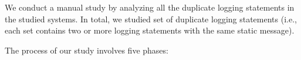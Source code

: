 \begin{comment}
This process involves 3 phases and is performed by the first
two authors (i.e., A1–A2) in this paper:
• Phase I: A1 derived a draft list of types of performed
actions based on 50 random answers. Then, A1 and
A2 use the draft list to categorize the answers collaboratively. During this phase the types are revised and refined.
• Phase II: A1 and A2 independently applied the re-
sulting types from Phase I to categorize all 384 an-
swers. A1 & A2 took notes regarding the deficiency or ambiguity of the labeling for obsolete answers.
• Phase III: A1, A2 discussed the coding results that were obtained in Phase II to resolve any disagreements until a consensus was reached. No new types of labeling were added during this discussion. The inter-rater agreement of this coding process has a Cohen’s kappa of 0.97, which indicates that the agreement level is high [7].
\end{comment}


\begin{comment}
This process involves 3 phases and was performed by the first two authors of this paper:
• Phase I: The first two authors manually check 50 rollbacks from the 369 sampled rollbacks and generate 13 manually-derived reasons (listed in Table 3). To better understand the reasons behind rollbacks, we also look at the comments and the revisions after a rollback.
• Phase II: The first two authors independently applied the derived reasons of Phase I to categorize all 369 sampled rollbacks. They took notes regarding the deficiency or ambiguity of the reasons for categorizing certain rollbacks. Cohen’s kappa [13] is calculated to measure the inter-rater agreement and the value is 0.87, which implies a high level of agreement.
• Phase III: The first two authors discussed the categorizing results obtained in Phase II to revolve the disagreements until a consensus was reached. No new reasons were added during this discussion.
\end{comment}

 We conduct a manual study by analyzing all the duplicate logging statements in the studied systems. In total, we studied   set of duplicate logging statements (i.e., each set contains two or more logging statements with the same static message). 

The process of our study involves five phases: 

